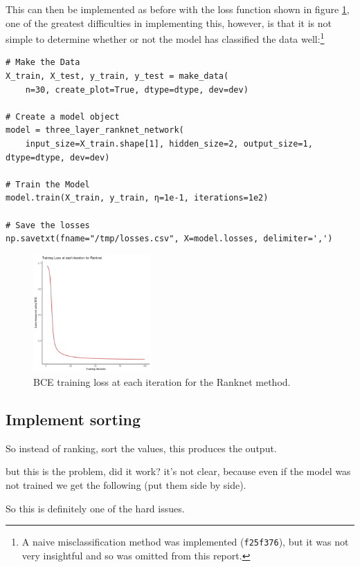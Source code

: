 \documentclass[a4paper,11pt,twoside]{article}
\begin{document}
This can then be implemented as before with the loss function shown
in figure \ref{fig:orgf297233}, one of the greatest difficulties in
implementing this, however, is that it is not simple to determine
whether or not the model has classified the data well:\footnote{A naive misclassification method was implemented (\texttt{f25f376}),
but it was not very insightful and so was omitted from this report.} 

\begin{verbatim}
# Make the Data
X_train, X_test, y_train, y_test = make_data(
    n=30, create_plot=True, dtype=dtype, dev=dev)

# Create a model object
model = three_layer_ranknet_network(
    input_size=X_train.shape[1], hidden_size=2, output_size=1, dtype=dtype, dev=dev)

# Train the Model
model.train(X_train, y_train, η=1e-1, iterations=1e2)

# Save the losses
np.savetxt(fname="/tmp/losses.csv", X=model.losses, delimiter=',')

\end{verbatim}

\begin{figure}[htbp]
\centering
\includegraphics[width=0.4\textwidth]{ranknet_loss.png}
\caption{\label{fig:orgf297233}BCE training loss at each iteration for the Ranknet method.}
\end{figure}

\subsection{Implement sorting}
\label{sec:org39e42bd}
So instead of ranking, sort the values, this produces the output.

but this is the problem, did it work? it's not clear, because even
if the model was not trained we get the following (put them side by side).

So this is definitely one of the hard issues.
\end{document}
